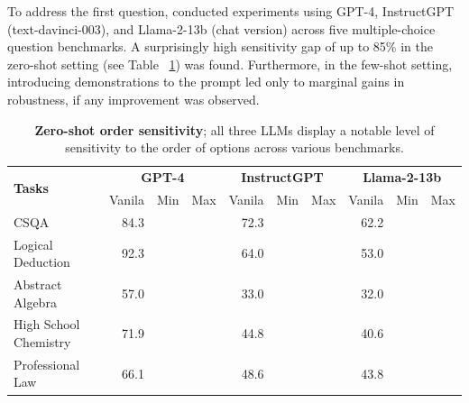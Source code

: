 To address the first question, \cite{pezeshkpour2024large} conducted experiments using GPT-4, InstructGPT (text-davinci-003), and Llama-2-13b (chat version) across five multiple-choice question benchmarks. A surprisingly high sensitivity gap of up to 85\% in the zero-shot setting (see Table ~\ref{tab:attack-zero}) was found. Furthermore, in the few-shot setting, introducing demonstrations to the prompt led only to marginal gains in robustness, if any improvement was observed.

\begin{table}[th!]
\small
\centering
\begin{tabular}{lrrrrrrrrr}
\toprule 
\multirow{2}{*}{\bf Tasks} & \multicolumn{3}{c}{\bf GPT-4}&  \multicolumn{3}{c}{\bf InstructGPT}&  \multicolumn{3}{c}{\bf Llama-2-13b}\\
\cmidrule(lr){2-4}
\cmidrule(lr){5-7}
\cmidrule(lr){8-10}
&Vanila&Min&Max&Vanila&Min&Max&Vanila&Min&Max\\
\midrule
CSQA &84.3&\color{cadmiumred}{-12.6}&\color{cadmiumgreen}{+10.3}&72.3&\color{cadmiumred}{-24.0}&\color{cadmiumgreen}{+19.1}&62.2&\color{cadmiumred}{-28.9}&\color{cadmiumgreen}{+25.5}\\
Logical Deduction&92.3&\color{cadmiumred}{-8.1}&\color{cadmiumgreen}{+5.0}&64.0&\color{cadmiumred}{-39.4}&\color{cadmiumgreen}{+34.7}&53.0&\color{cadmiumred}{-30.7}&\color{cadmiumgreen}{+34.7}\\
Abstract Algebra &57.0&\color{cadmiumred}{-30.0}&\color{cadmiumgreen}{+23.0}&33.0&\color{cadmiumred}{-31.0}&\color{cadmiumgreen}{+39.0}&32.0&\color{cadmiumred}{-32.0}&\color{cadmiumgreen}{+53.0}\\
High School Chemistry &71.9&\color{cadmiumred}{-23.6}&\color{cadmiumgreen}{+18.2}&44.8&\color{cadmiumred}{-28.5}&\color{cadmiumgreen}{+38.0}&40.6&\color{cadmiumred}{-32.7}&\color{cadmiumgreen}{+45.6}\\
Professional Law &66.1&\color{cadmiumred}{-12.7}&\color{cadmiumgreen}{+12.1}&48.6&\color{cadmiumred}{-24.9}&\color{cadmiumgreen}{+25.7}&43.8&\color{cadmiumred}{-32.8}&\color{cadmiumgreen}{+32.9}\\
\bottomrule
\end{tabular}
\caption{\textbf{Zero-shot order sensitivity}; all three LLMs display a notable level of sensitivity to the order of options across various benchmarks.}
\label{tab:attack-zero}
\end{table}

